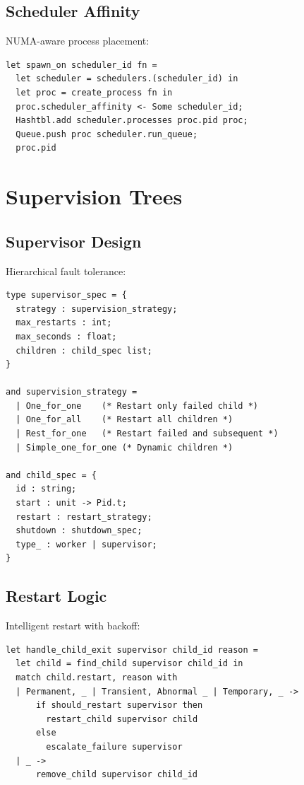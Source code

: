 \documentclass[12pt,a4paper]{report}
\begin{document}
\subsection{Scheduler Affinity}

NUMA-aware process placement:

\begin{lstlisting}
let spawn_on scheduler_id fn =
  let scheduler = schedulers.(scheduler_id) in
  let proc = create_process fn in
  proc.scheduler_affinity <- Some scheduler_id;
  Hashtbl.add scheduler.processes proc.pid proc;
  Queue.push proc scheduler.run_queue;
  proc.pid
\end{lstlisting}

\section{Supervision Trees}

\subsection{Supervisor Design}

Hierarchical fault tolerance:

\begin{lstlisting}
type supervisor_spec = {
  strategy : supervision_strategy;
  max_restarts : int;
  max_seconds : float;
  children : child_spec list;
}

and supervision_strategy =
  | One_for_one    (* Restart only failed child *)
  | One_for_all    (* Restart all children *)
  | Rest_for_one   (* Restart failed and subsequent *)
  | Simple_one_for_one (* Dynamic children *)

and child_spec = {
  id : string;
  start : unit -> Pid.t;
  restart : restart_strategy;
  shutdown : shutdown_spec;
  type_ : worker | supervisor;
}
\end{lstlisting}

\subsection{Restart Logic}

Intelligent restart with backoff:

\begin{lstlisting}
let handle_child_exit supervisor child_id reason =
  let child = find_child supervisor child_id in
  match child.restart, reason with
  | Permanent, _ | Transient, Abnormal _ | Temporary, _ ->
      if should_restart supervisor then
        restart_child supervisor child
      else
        escalate_failure supervisor
  | _ ->
      remove_child supervisor child_id
\end{lstlisting}
\end{document}
